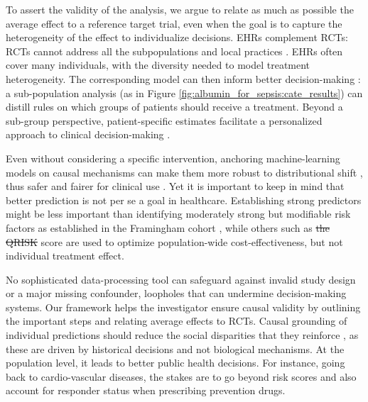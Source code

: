 \documentclass[10pt,letterpaper]{article}
\providecommand{\DIFaddtex}[1]{{\protect\color{blue}\uwave{#1}}} %
\providecommand{\DIFdeltex}[1]{{\protect\color{red}\sout{#1}}}                      %
\providecommand{\DIFaddbegin}{} %
\providecommand{\DIFaddend}{} %
\providecommand{\DIFdelbegin}{} %
\providecommand{\DIFdelend}{} %
\providecommand{\DIFadd}[1]{\texorpdfstring{\DIFaddtex{#1}}{#1}} %
\providecommand{\DIFdel}[1]{\texorpdfstring{\DIFdeltex{#1}}{}} %
\newcommand{\DIFscaledelfig}{0.5}
\newlength{\DIFdelgraphicswidth} %
\newlength{\DIFdelgraphicsheight} %
\newcommand{\DIFaddincludegraphics}[2][]{{\color{blue}\fbox{\DIFOincludegraphics[#1]{#2}}}} %
\newcommand{\DIFdelincludegraphics}[2][]{%
\sbox{\DIFdelgraphicsbox}{\DIFOincludegraphics[#1]{#2}}%
\settoboxwidth{\DIFdelgraphicswidth}{\DIFdelgraphicsbox} %
\settoboxtotalheight{\DIFdelgraphicsheight}{\DIFdelgraphicsbox} %
\scalebox{\DIFscaledelfig}{%
\parbox[b]{\DIFdelgraphicswidth}{\usebox{\DIFdelgraphicsbox}\\[-\baselineskip] \rule{\DIFdelgraphicswidth}{0em}}\llap{\resizebox{\DIFdelgraphicswidth}{\DIFdelgraphicsheight}{%
\setlength{\unitlength}{\DIFdelgraphicswidth}%
\begin{picture}(1,1)%
\thicklines\linethickness{2pt} %
{\color[rgb]{1,0,0}\put(0,0){\framebox(1,1){}}}%
{\color[rgb]{1,0,0}\put(0,0){\line( 1,1){1}}}%
{\color[rgb]{1,0,0}\put(0,1){\line(1,-1){1}}}%
\end{picture}%
}\hspace*{3pt}}} %
} %
\DeclareRobustCommand{\DIFaddbegin}{\DIFOaddbegin \let\includegraphics\DIFaddincludegraphics} %
\DeclareRobustCommand{\DIFaddend}{\DIFOaddend \let\includegraphics\DIFOincludegraphics} %
\DeclareRobustCommand{\DIFdelbegin}{\DIFOdelbegin \let\includegraphics\DIFdelincludegraphics} %
\DeclareRobustCommand{\DIFdelend}{\DIFOaddend \let\includegraphics\DIFOincludegraphics} %
\begin{document}
To assert the validity of the analysis, we argue to relate as much as
possible the average effect to a reference target trial, even when the
goal is to capture the heterogeneity of the effect to individualize
decisions.
EHRs complement RCTs: RCTs cannot address all the
subpopulations and local practices
\cite{travers2007external,kennedy2015literature}. EHRs often cover many
individuals, with the diversity needed to model treatment
heterogeneity. The corresponding model can then inform better
decision-making \cite{prosperi2020causal}: a sub-population analysis  (as in Figure
\ref{fig:albumin_for_sepsis:cate_results}) can distill rules on which groups
of patients should receive a treatment. Beyond a sub-group perspective,
patient-specific estimates facilitate a personalized approach
to clinical decision-making \cite{kent2018personalized}.
%

Even without considering a specific intervention, anchoring
machine-learning models on
causal mechanisms can make them more robust to distributional shift \cite{scholkopf2021toward},
thus safer and fairer for clinical use
\cite{richens2020improving,plecko2022causal}.
%
Yet it is important to keep in mind that better prediction is not per se
a goal in healthcare.
%
Establishing strong predictors might be less important than identifying
moderately strong but modifiable risk factors as established in the Framingham
cohort \cite{brand1976multivariate}, while others such as \DIFdelbegin \DIFdel{the QRISK }\DIFdelend \DIFaddbegin \DIFadd{predictive }\DIFaddend score are
used to optimize population-wide cost-effectiveness, but not individual
treatment effect.

No sophisticated data-processing tool can safeguard against
invalid study design or a major missing confounder, loopholes that can
undermine decision-making systems. Our framework helps the investigator
ensure
causal validity by outlining the important steps and relating average effects to
RCTs. Causal grounding of individual predictions should reduce the social
disparities that they reinforce
\cite{rajkomar2018ensuring,mitra2022future,ehrmann2023making}, as these are driven by
historical decisions and not biological mechanisms. At the population
level, it leads to better public health decisions. For instance, going
back to cardio-vascular diseases, the stakes are to go beyond risk
scores and also account for responder status when prescribing prevention
drugs.
\end{document}
